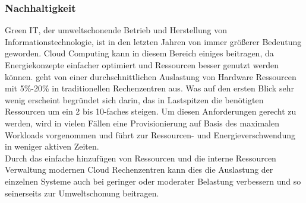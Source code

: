 \subsubsection{Nachhaltigkeit}\label{nachhaltigkeit}
Green IT, der umweltschonende Betrieb und Herstellung von Informationstechnologie, ist in den letzten Jahren von immer größerer Bedeutung geworden. Cloud Computing kann in diesem Bereich einiges beitragen, da Energiekonzepte einfacher optimiert und Ressourcen besser genutzt werden können. \cite*{Siegele.2008} geht von einer durchschnittlichen Auslastung von Hardware Ressourcen mit 5\%-20\% in traditionellen Rechenzentren aus. Was auf den ersten Blick sehr wenig erscheint begründet sich darin, das in Lastspitzen die benötigten Ressourcen um ein 2 bis 10-faches steigen. Um diesen Anforderungen gerecht zu werden, wird in vielen Fällen eine Provisionierung auf Basis des maximalen Workloads vorgenommen und führt zur Ressourcen- und Energieverschwendung in weniger aktiven Zeiten.\\
Durch das einfache hinzufügen von Ressourcen und die interne Ressourcen Verwaltung modernen Cloud Rechenzentren kann dies die Auslastung der einzelnen Systeme auch bei geringer oder moderater Belastung verbessern und so seinerseits zur Umweltschonung beitragen. 

